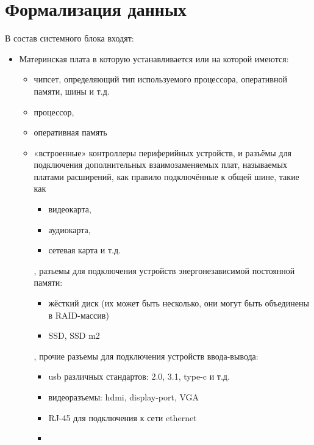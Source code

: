 \section{Формализация данных}
В состав системного блока входят:
\begin{itemize}
    \item 
        Материнская плата в которую устанавливается или на которой имеются:
        \begin{itemize}
            \item 
                чипсет, определяющий тип используемого процессора, оперативной памяти, шины и т.д.
            \item 
                процессор, 
            \item 
                оперативная память 
            \item 
                «встроенные» контроллеры периферийных устройств, и разъёмы для подключения дополнительных взаимозаменяемых плат, называемых платами расширений, как правило подключённые к общей шине, такие как 
                \begin{itemize}
                    \item 
                        видеокарта, 
                    \item 
                        аудиокарта, 
                    \item 
                        сетевая карта и т.д.
                \end{itemize}
                , разъемы для подключения устройств энергонезависимой постоянной памяти:
                \begin{itemize}
                    \item 
                        жёсткий диск (их может быть несколько, они могут быть объединены в RAID-массив)
                    \item 
                        SSD, SSD m2
                \end{itemize}
                , прочие разъемы для подключения устройств ввода-вывода:
                \begin{itemize}
                    \item 
                        usb различных стандартов: 2.0, 3.1, type-c и т.д.
                    \item 
                        видеоразъемы: hdmi, display-port, VGA
                    \item 
                        RJ-45 для подключения к сети ethernet
                    \item 

\end{itemize}
\end{itemize}
\end{itemize}
